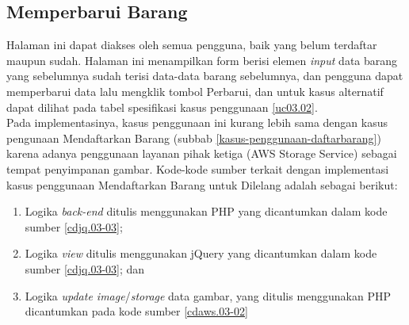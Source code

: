 \subsection{Memperbarui Barang}
Halaman ini dapat diakses oleh semua pengguna, baik yang belum terdaftar maupun sudah. Halaman ini menampilkan form berisi elemen \textit{input} data barang yang sebelumnya sudah terisi data-data barang sebelumnya, dan pengguna dapat memperbarui data lalu mengklik tombol Perbarui, dan untuk kasus alternatif dapat dilihat pada tabel spesifikasi kasus penggunaan \ref{uc03.02}.\\
\indent Pada implementasinya, kasus penggunaan ini kurang lebih sama dengan kasus pengunaan Mendaftarkan Barang (subbab \ref{kasus-penggunaan-daftarbarang}) karena adanya penggunaan layanan pihak ketiga (AWS Storage Service) sebagai tempat penyimpanan gambar. Kode-kode sumber terkait dengan implementasi kasus penggunaan Mendaftarkan Barang untuk Dilelang adalah sebagai berikut:
\begin{enumerate}
	\item Logika \textit{back-end} ditulis menggunakan PHP yang dicantumkan dalam kode sumber \ref{cdjq.03-03}; 
	\item Logika \textit{view} ditulis menggunakan jQuery yang dicantumkan dalam kode sumber \ref{cdjq.03-03}; dan
	\item Logika \textit{update image}/\textit{storage} data gambar, yang ditulis menggunakan PHP dicantumkan pada kode sumber \ref{cdaws.03-02}
\end{enumerate} 

